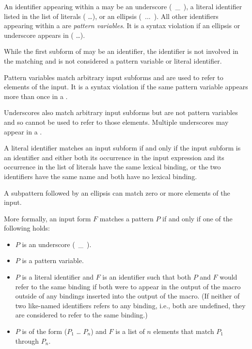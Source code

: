 \begin{entry}{%
}
An identifier appearing within a  may be an underscore
(~{\cf \_}~), a literal identifier listed in the list of literals
{\cf ( \dots)}, or an ellipsis (~{\cf ...}~).
All other identifiers appearing within a  are
\textit{pattern variables}.
It is a syntax violation if an ellipsis or underscore appears in {\cf ( \dots)}.

While the first subform of  may be an identifier, the
identifier is not involved in the matching and
is not considered a pattern variable or literal identifier.

Pattern variables match arbitrary input subforms and
are used to refer to elements of the input.
It is a syntax violation if the same pattern variable appears more than once in a
.

Underscores also match arbitrary input subforms but are not pattern variables
and so cannot be used to refer to those elements.
Multiple underscores may appear in a .

A literal identifier matches an input subform if and only if the input
subform is an identifier and either both its occurrence in the input
expression and its occurrence in the list of literals have the same
lexical binding, or the two identifiers have the same name and both have
no lexical binding.

A subpattern followed by an ellipsis can match zero or more elements of
the input.

More formally, an input form $F$ matches a pattern $P$ if and only if
one of the following holds:

\begin{itemize}
\item $P$ is an underscore (~{\cf \_}~).

\item $P$ is a pattern variable.

\item $P$ is a literal identifier
and $F$ is an identifier such that both $P$ and $F$ would refer to the
same binding if both were to appear in the output of the macro outside
of any bindings inserted into the output of the macro.
(If neither of two like-named identifiers refers to any binding, i.e., both
are undefined, they are considered to refer to the same binding.)

\item $P$ is of the form
{\cf ($P_1$ \dots{} $P_n$)}
and $F$ is a list of $n$ elements that match $P_1$ through
$P_n$.


\end{itemize}
\end{entry}

